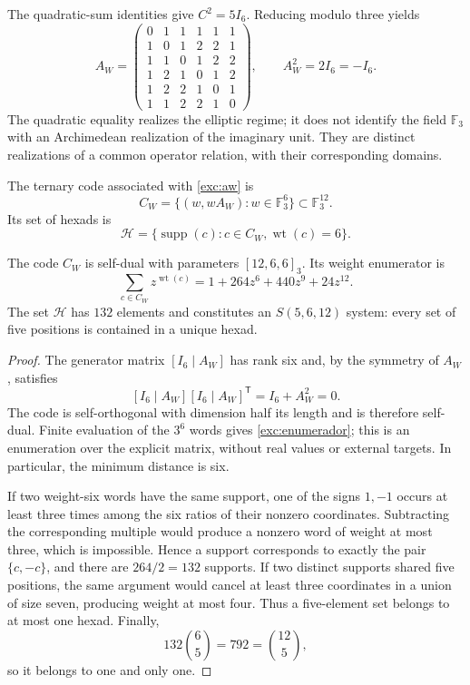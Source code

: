 The quadratic-sum identities give $C^2=5I_6$. Reducing modulo
three yields
\begin{equation}
 A_W=
 \begin{pmatrix}
 0&1&1&1&1&1\\
 1&0&1&2&2&1\\
 1&1&0&1&2&2\\
 1&2&1&0&1&2\\
 1&2&2&1&0&1\\
 1&1&2&2&1&0
 \end{pmatrix},
 \qquad A_W^2=2I_6=-I_6.
 \label{exc:aw}
\end{equation}
The quadratic equality realizes the elliptic regime; it does not identify the
field $\mathbb F_3$ with an Archimedean realization of the imaginary
unit. They are distinct realizations of a common operator
relation, with their corresponding domains.

\begin{definition}
\label{exc:codigo}
The ternary code associated with \eqref{exc:aw} is
\[
 C_W=\{(w,wA_W):w\in\mathbb F_3^6\}
       \subset\mathbb F_3^{12}.
\]
Its set of hexads is
\[
 \mathcal H=
 \{\operatorname{supp}(c):c\in C_W,
                           \operatorname{wt}(c)=6\}.
\]
\end{definition}

\begin{proposition}
\label{exc:codigo-witt}
The code $C_W$ is self-dual with parameters $[12,6,6]_3$. Its weight
enumerator is
\begin{equation}
 \sum_{c\in C_W}z^{\operatorname{wt}(c)}
   =1+264z^6+440z^9+24z^{12}.
 \label{exc:enumerador}
\end{equation}
The set $\mathcal H$ has $132$ elements and constitutes an
$S(5,6,12)$ system: every set of five positions is contained in a
unique hexad.
\end{proposition}

\begin{proof}
The generator matrix $[I_6\mid A_W]$ has rank six and, by the symmetry
of $A_W$, satisfies
\[
 [I_6\mid A_W][I_6\mid A_W]^{\mathsf T}
   =I_6+A_W^2=0.
\]
The code is self-orthogonal with dimension half its length and is therefore
self-dual. Finite evaluation of the $3^6$ words gives
\eqref{exc:enumerador}; this is an enumeration over the explicit matrix,
without real values or external targets. In particular, the minimum
distance is six.

If two weight-six words have the same support, one of the signs $1,-1$
occurs at least three times among the six ratios of their nonzero
coordinates. Subtracting the corresponding multiple would produce
a nonzero word of weight at most three, which is impossible. Hence a support
corresponds to exactly the pair $\{c,-c\}$, and there are $264/2=132$
supports. If two distinct supports shared five positions,
the same argument would cancel at least three coordinates in a union
of size seven, producing weight at most four. Thus a
five-element set belongs to at most one hexad. Finally,
\[
 132\binom65=792=\binom{12}5,
\]
so it belongs to one and only one.
\end{proof}

